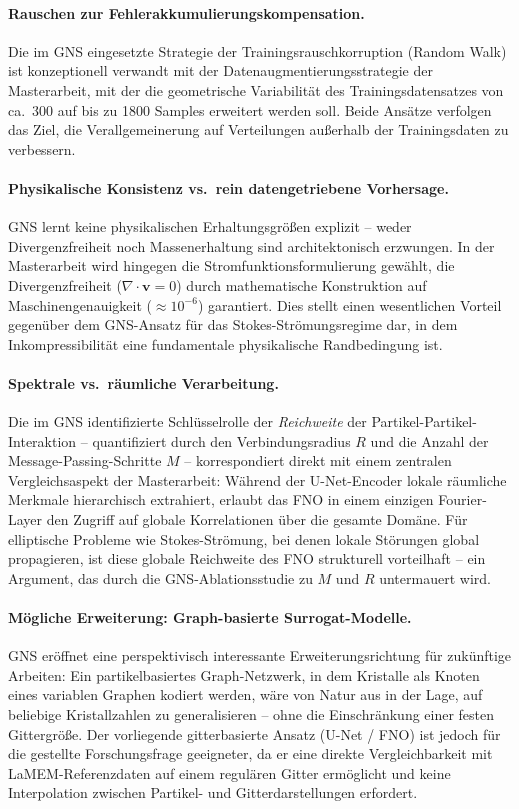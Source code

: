 \documentclass[a4paper,12pt]{article}
\begin{document}
\paragraph{Rauschen zur Fehlerakkumulierungskompensation.}
Die im GNS eingesetzte Strategie der Trainingsrauschkorruption (Random Walk) ist
konzeptionell verwandt mit der Datenaugmentierungsstrategie der Masterarbeit, mit der
die geometrische Variabilität des Trainingsdatensatzes von ca.\ 300 auf bis zu 1800
Samples erweitert werden soll. Beide Ansätze verfolgen das Ziel, die Verallgemeinerung
auf Verteilungen außerhalb der Trainingsdaten zu verbessern.

\paragraph{Physikalische Konsistenz vs.\ rein datengetriebene Vorhersage.}
GNS lernt keine physikalischen Erhaltungsgrößen explizit -- weder Divergenzfreiheit
noch Massenerhaltung sind architektonisch erzwungen. In der Masterarbeit wird
hingegen die Stromfunktionsformulierung gewählt, die Divergenzfreiheit ($\nabla
\cdot \mathbf{v} = 0$) durch mathematische Konstruktion auf Maschinengenauigkeit
($\approx 10^{-6}$) garantiert. Dies stellt einen wesentlichen Vorteil gegenüber
dem GNS-Ansatz für das Stokes-Strömungsregime dar, in dem Inkompressibilität eine
fundamentale physikalische Randbedingung ist.

\paragraph{Spektrale vs.\ räumliche Verarbeitung.}
Die im GNS identifizierte Schlüsselrolle der \emph{Reichweite} der
Partikel-Partikel-Interaktion -- quantifiziert durch den Verbindungsradius $R$ und
die Anzahl der Message-Passing-Schritte $M$ -- korrespondiert direkt mit einem
zentralen Vergleichsaspekt der Masterarbeit: Während der U-Net-Encoder lokale
räumliche Merkmale hierarchisch extrahiert, erlaubt das FNO in einem einzigen
Fourier-Layer den Zugriff auf globale Korrelationen über die gesamte Domäne.
Für elliptische Probleme wie Stokes-Strömung, bei denen lokale Störungen global
propagieren, ist diese globale Reichweite des FNO strukturell vorteilhaft --
ein Argument, das durch die GNS-Ablationsstudie zu $M$ und $R$ untermauert wird.

\paragraph{Mögliche Erweiterung: Graph-basierte Surrogat-Modelle.}
GNS eröffnet eine perspektivisch interessante Erweiterungsrichtung für zukünftige
Arbeiten: Ein partikelbasiertes Graph-Netzwerk, in dem Kristalle als Knoten eines
variablen Graphen kodiert werden, wäre von Natur aus in der Lage, auf beliebige
Kristallzahlen zu generalisieren -- ohne die Einschränkung einer festen Gittergröße.
Der vorliegende gitterbasierte Ansatz (U-Net / FNO) ist jedoch für die gestellte
Forschungsfrage geeigneter, da er eine direkte Vergleichbarkeit mit LaMEM-Referenzdaten
auf einem regulären Gitter ermöglicht und keine Interpolation zwischen Partikel-
und Gitterdarstellungen erfordert.
\end{document}
